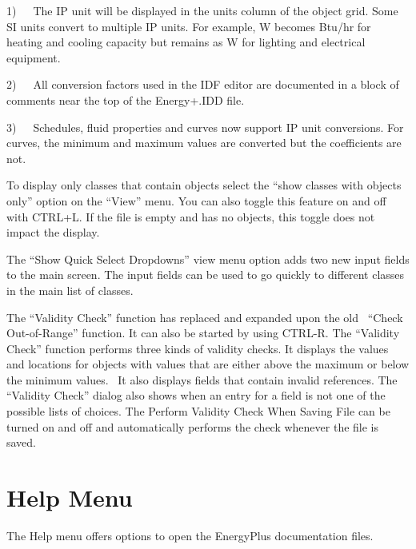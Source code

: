 1)~~~The IP unit will be displayed in the units column of the object grid. Some SI units convert to multiple IP units. For example, W becomes Btu/hr for heating and cooling capacity but remains as W for lighting and electrical equipment.

2)~~~All conversion factors used in the IDF editor are documented in a block of comments near the top of the Energy+.IDD file.

3)~~~Schedules, fluid properties and curves now support IP unit conversions. For curves, the minimum and maximum values are converted but the coefficients are not.

To display only classes that contain objects select the ``show classes with objects only'' option on the ``View'' menu. You can also toggle this feature on and off with CTRL+L. If the file is empty and has no objects, this toggle does not impact the display.

The ``Show Quick Select Dropdowns'' view menu option adds two new input fields to the main screen. The input fields can be used to go quickly to different classes in the main list of classes.

The ``Validity Check'' function has replaced and expanded upon the old~ ``Check Out-of-Range'' function. It can also be started by using CTRL-R. The ``Validity Check'' function performs three kinds of validity checks. It displays the values and locations for objects with values that are either above the maximum or below the minimum values.~ It also displays fields that contain invalid references. The ``Validity Check'' dialog also shows when an entry for a field is not one of the possible lists of choices. The Perform Validity Check When Saving File can be turned on and off and automatically performs the check whenever the file is saved.

\section{Help Menu}\label{help-menu-000}

The Help menu offers options to open the EnergyPlus documentation files.
